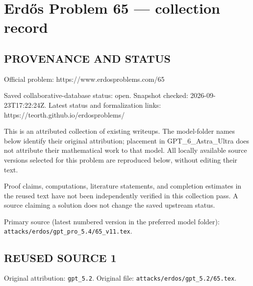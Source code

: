 \section*{Erd\H{o}s Problem 65 --- collection record}

\subsection*{PROVENANCE AND STATUS}
Official problem: https://www.erdosproblems.com/65

Saved collaborative-database status: open.
Snapshot checked: 2026-09-23T17:22:24Z.
Latest status and formalization links: https://teorth.github.io/erdosproblems/

This is an attributed collection of existing writeups. The model-folder names below identify their original attribution; placement in GPT\_6\_Astra\_Ultra does not attribute their mathematical work to that model. All locally available source versions selected for this problem are reproduced below, without editing their text.

Proof claims, computations, literature statements, and completion estimates in the reused text have not been independently verified in this collection pass. A source claiming a solution does not change the saved upstream status.

Primary source (latest numbered version in the preferred model folder): \texttt{attacks/erdos/gpt\_pro\_5.4/65\_v11.tex}.

\subsection*{REUSED SOURCE 1}
Original attribution: \texttt{gpt\_5.2}.
Original file: \texttt{attacks/erdos/gpt\_5.2/65.tex}.

